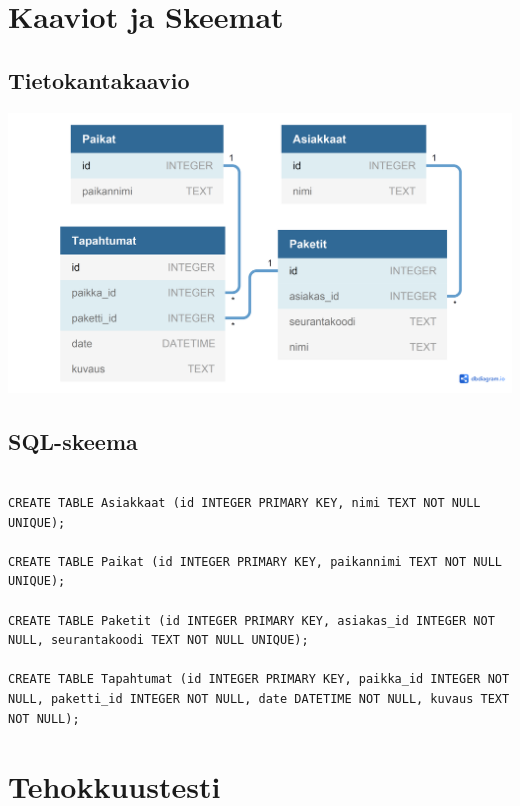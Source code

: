 \documentclass[11pt,a4paper]{article}
\begin{document}
\newpage
\section{Kaaviot ja Skeemat}
\subsection{Tietokantakaavio}
\begin{left}
\includegraphics[scale=0.25]{tietokanta_kaavio.png} 
\end{left}

\subsection{SQL-skeema}
\begin{lstlisting}

CREATE TABLE Asiakkaat (id INTEGER PRIMARY KEY, nimi TEXT NOT NULL UNIQUE);

CREATE TABLE Paikat (id INTEGER PRIMARY KEY, paikannimi TEXT NOT NULL UNIQUE);

CREATE TABLE Paketit (id INTEGER PRIMARY KEY, asiakas_id INTEGER NOT NULL, seurantakoodi TEXT NOT NULL UNIQUE);

CREATE TABLE Tapahtumat (id INTEGER PRIMARY KEY, paikka_id INTEGER NOT NULL, paketti_id INTEGER NOT NULL, date DATETIME NOT NULL, kuvaus TEXT NOT NULL);
\end{lstlisting}
\newpage

\section{Tehokkuustesti}
\end{document}
